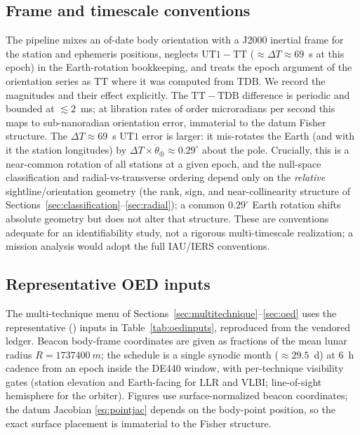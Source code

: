 \subsection{Frame and timescale conventions}
\label{app:conventions}

The pipeline mixes an of-date body orientation with a J2000 inertial frame for the
station and ephemeris positions, neglects $\mathrm{UT1}-\mathrm{TT}$
($\approx\!\Delta T\approx69$~s at this epoch) in the Earth-rotation bookkeeping,
and treats the epoch argument of the orientation series as $\mathrm{TT}$ where it
was computed from $\mathrm{TDB}$. We record the magnitudes and their effect
explicitly. The $\mathrm{TT}-\mathrm{TDB}$ difference is periodic and bounded at
$\lesssim2$~ms; at libration rates of order microradians per second this maps to
sub-nanoradian orientation error, immaterial to the datum Fisher structure. The
$\Delta T\approx69$~s $\mathrm{UT1}$ error is larger: it mis-rotates the Earth (and
with it the station longitudes) by $\Delta T\times\dot\theta_\oplus\approx0.29^\circ$
about the pole. Crucially, this is a near-common rotation of all stations at a
given epoch, and the null-space classification and radial-vs-transverse ordering
depend only on the \emph{relative} sightline/orientation geometry (the rank,
sign, and near-collinearity structure of Sections~\ref{sec:classification}--\ref{sec:radial});
a common $0.29^\circ$ Earth rotation shifts absolute geometry but does not alter
that structure. These are \Modelled{} conventions adequate for an identifiability
study, not a rigorous multi-timescale realization; a mission analysis would adopt
the full IAU/IERS conventions.

\subsection{Representative OED inputs}
\label{app:oedinputs}

The multi-technique menu of Sections~\ref{sec:multitechnique}--\ref{sec:oed} uses
the representative (\Modelled) inputs in Table~\ref{tab:oedinputs}, reproduced from
the vendored ledger. Beacon body-frame coordinates are given as fractions of the
mean lunar radius $R=\SI{1737400}{m}$; the schedule is a single synodic month
($\approx29.5$~d) at $6$~h cadence from an epoch inside the DE440 window, with
per-technique visibility gates (station elevation and Earth-facing for LLR and
VLBI; line-of-sight hemisphere for the orbiter). Figures use surface-normalized
beacon coordinates; the datum Jacobian \eqref{eq:pointjac} depends on the
body-point position, so the exact surface placement is immaterial to the Fisher
structure.

